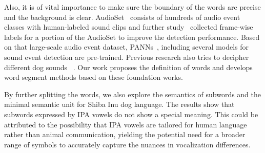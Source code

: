 
Also, it is of vital importance to make sure the boundary of the words are precise and the background is clear. AudioSet~\cite{gemmeke2017audio} consists of hundreds of audio event classes with human-labeled sound clips and further study~\cite{hershey2021benefit} collected frame-wise labels for a portion of the AudioSet to improve the detection performance. Based on that large-scale audio event dataset, PANNs~\cite{kong2020panns}, including several models for sound event detection are pre-trained. Previous research also tries to decipher different dog sounds ~\cite{web2023sounds, web2018yip}. Our work proposes the definition of words and develops word segment methods based on these foundation works. 

By further splitting the words, we also explore the semantics of subwords and the minimal semantic unit for Shiba Inu dog language. The results show that subwords expressed by IPA vowels do not show a special meaning. This could be attributed to the possibility that IPA vowels are tailored for human language rather than animal communication, yielding the potential need for a broader range of symbols to accurately capture the nuances in vocalization differences.

